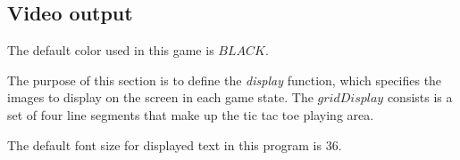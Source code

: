 \documentclass{led_doc}
\begin{document}
\begin{ledCmnt}
\section{Video output}

The default color used in this game is $BLACK$.
\end{ledCmnt}

\begin{ledDef}
\end{ledDef}

\begin{ledDef}
\end{ledDef}

\begin{ledDef}
\end{ledDef}

\begin{ledDef}
\end{ledDef}

\begin{ledDef}
\end{ledDef}

\begin{ledCmnt}
The purpose of this section is to define the {\em display} function,
which specifies the images to display on the screen in each game state.
The  $gridDisplay$ consists is a set of four line segments that make up the tic
tac toe playing area.
\end{ledCmnt}

\begin{ledDef}
\end{ledDef}

\begin{ledCmnt}
The default font size for displayed text in this program is 36.
\end{ledCmnt}
\end{document}
